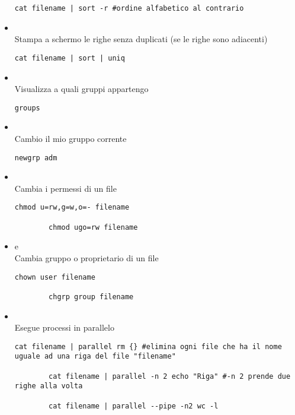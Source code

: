 \documentclass[../main.tex]{subfiles}
\begin{document}
\begin{itemize}
\begin{lstlisting}[style=bash]
        cat filename | sort -r #ordine alfabetico al contrario
    \end{lstlisting}
    \item {} \\
    Stampa a schermo le righe senza duplicati (se le righe sono adiacenti)
    \begin{lstlisting}[style=bash]
        cat filename | sort | uniq
    \end{lstlisting}
    \item {} \\
    Visualizza a quali gruppi appartengo
    \begin{lstlisting}[style=bash]
        groups
    \end{lstlisting}
    \item {} \\
    Cambio il mio gruppo corrente
    \begin{lstlisting}[style=bash]
        newgrp adm
    \end{lstlisting}
    \item {} \\
    Cambia i permessi di un file
    \begin{lstlisting}[style=bash]
        chmod u=rw,g=w,o=- filename

        chmod ugo=rw filename
    \end{lstlisting}
    \item {} e  \\
    Cambia gruppo o proprietario di un file
    \begin{lstlisting}[style=bash]
        chown user filename

        chgrp group filename
    \end{lstlisting}
    \item {} \\
    Esegue processi in parallelo
    \begin{lstlisting}[style=bash]
        cat filename | parallel rm {} #elimina ogni file che ha il nome uguale ad una riga del file "filename"

        cat filename | parallel -n 2 echo "Riga" #-n 2 prende due righe alla volta

        cat filename | parallel --pipe -n2 wc -l
    \end{lstlisting}
\end{itemize}
\pagebreak
\end{document}
